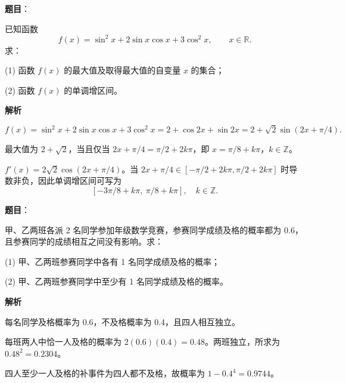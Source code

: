 \begin{answer}

\textbf{题目}：

已知函数
\nopagebreak[4]
\[
f(x)=\sin^2x+2\sin x\cos x+3\cos^2x,\qquad x\in\mathbb R.
\]
求：

(1) 函数 \(f(x)\) 的最大值及取得最大值的自变量 \(x\) 的集合；

(2) 函数 \(f(x)\) 的单调增区间。

\textbf{解析}

\nopagebreak[4]
\[
f(x)=\sin^2x+2\sin x\cos x+3\cos^2x
=2+\cos2x+\sin2x
=2+\sqrt2\sin(2x+\pi/4).
\]

最大值为 $2+\sqrt2$，当且仅当 $2x+\pi/4=\pi/2+2k\pi$，即 $x=\pi/8+k\pi$，$k\in\mathbb Z$。


$f'(x)=2\sqrt2\cos(2x+\pi/4)$。当 $2x+\pi/4\in[-\pi/2+2k\pi,\pi/2+2k\pi]$ 时导数非负，因此单调增区间可写为
\nopagebreak[4]
\[
[-3\pi/8+k\pi,\ \pi/8+k\pi],\quad k\in\mathbb Z.
\]



\end{answer}
\begin{answer}

\textbf{题目}：

甲、乙两班各派 2 名同学参加年级数学竞赛，参赛同学成绩及格的概率都为 0.6，且参赛同学的成绩相互之间没有影响。求：

(1) 甲、乙两班参赛同学中各有 1 名同学成绩及格的概率；

(2) 甲、乙两班参赛同学中至少有 1 名同学成绩及格的概率。

\textbf{解析}

每名同学及格概率为 0.6，不及格概率为 0.4，且四人相互独立。


每班两人中恰一人及格的概率为 $2(0.6)(0.4)=0.48$。两班独立，所求为 $0.48^2=0.2304$。


四人至少一人及格的补事件为四人都不及格，故概率为 $1-0.4^4=0.9744$。



\end{answer}
